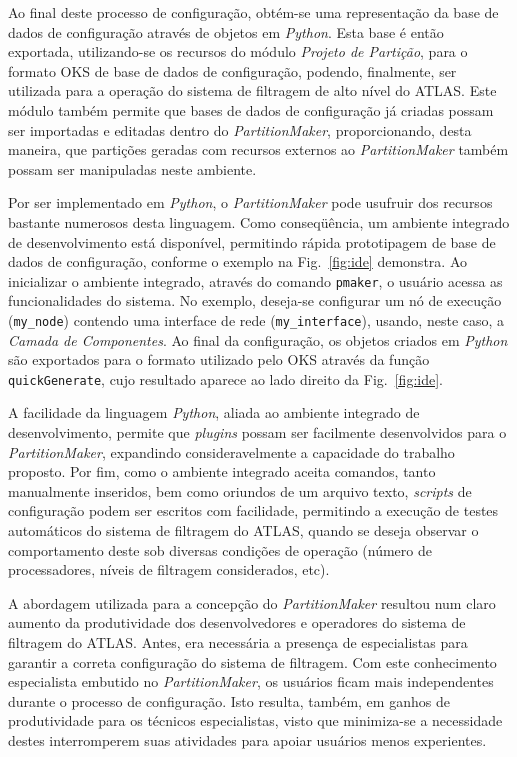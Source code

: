 Ao final deste processo de configuração, obtém-se uma representação da base de dados de configuração através de objetos em \emph{Python}. Esta base é então exportada, utilizando-se os recursos do módulo \emph{Projeto de Partição}, para o formato OKS de base de dados de configuração, podendo, finalmente, ser utilizada para a operação do sistema de filtragem de alto nível do ATLAS. Este módulo também permite que bases de dados de configuração já criadas possam ser importadas e editadas dentro do \emph{PartitionMaker}, proporcionando, desta maneira, que partições geradas com recursos externos ao \emph{PartitionMaker} também possam ser manipuladas neste ambiente.

Por ser implementado em \emph{Python}, o \emph{PartitionMaker} pode usufruir dos recursos bastante numerosos  desta linguagem. Como conseqüência, um ambiente integrado de desenvolvimento está disponível, permitindo rápida prototipagem de base de dados de configuração, conforme o exemplo na Fig.~\ref{fig:ide} demonstra. Ao inicializar o ambiente integrado, através do comando \texttt{pmaker}, o usuário acessa as funcionalidades do sistema. No exemplo, deseja-se configurar um nó de execução (\texttt{my\_node}) contendo uma interface de rede (\texttt{my\_interface}), usando, neste caso, a \emph{Camada de Componentes}. Ao final da configuração, os objetos criados em \emph{Python} são exportados para o formato utilizado pelo OKS através da função \texttt{quickGenerate}, cujo resultado aparece ao lado direito da Fig.~\ref{fig:ide}.

A facilidade da linguagem \emph{Python}, aliada ao ambiente integrado de desenvolvimento, permite que \emph{plugins} possam ser facilmente desenvolvidos para o \emph{PartitionMaker},  expandindo consideravelmente a capacidade do trabalho proposto. Por fim, como o ambiente integrado aceita comandos, tanto manualmente inseridos, bem como oriundos de um arquivo texto, \emph{scripts} de configuração podem ser escritos com facilidade, permitindo a execução de testes automáticos do sistema de filtragem do ATLAS, quando se deseja observar o comportamento deste sob diversas condições de operação (número de processadores, níveis de filtragem considerados, etc).

A abordagem utilizada para a concepção do \emph{PartitionMaker} resultou num claro aumento da produtividade dos desenvolvedores e operadores do sistema de filtragem do ATLAS. Antes, era necessária a presença de especialistas para garantir a correta configuração do sistema de filtragem. Com este conhecimento especialista embutido no \emph{PartitionMaker}, os usuários ficam mais independentes durante o processo de configuração. Isto resulta, também, em ganhos de produtividade para os técnicos especialistas, visto que minimiza-se a necessidade destes interromperem suas atividades para apoiar usuários menos experientes.

